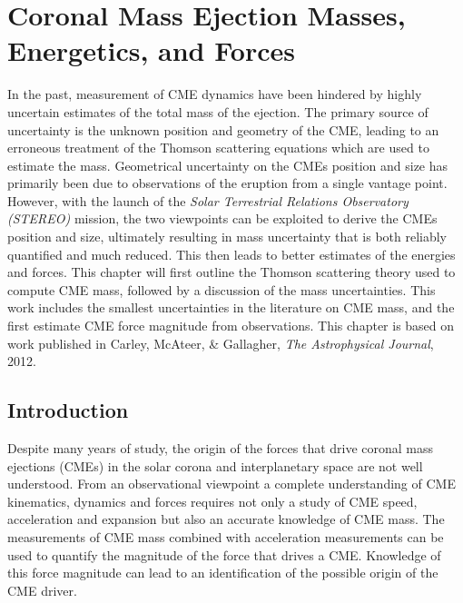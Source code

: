 
\singlespacing
\chapter{Coronal Mass Ejection Masses, Energetics, and Forces} 
\label{chap:4}
\vspace{-6mm}
\doublespacing
In the past, measurement of CME dynamics have been hindered by highly uncertain estimates of the total mass of the ejection. The primary source of uncertainty is the unknown position and geometry of the CME, leading to an erroneous treatment of the Thomson scattering equations which are used to estimate the mass. Geometrical uncertainty on the CMEs position and size has primarily been due to observations of the eruption from a single vantage point. However, with the launch of the {\it Solar Terrestrial Relations Observatory (STEREO)} mission, the two viewpoints can be exploited to derive the CMEs position and size, ultimately resulting in mass uncertainty that is both reliably quantified and much reduced. This then leads to better estimates of the energies and forces. This chapter will first outline the Thomson scattering theory used to compute CME mass, followed by a discussion of the mass uncertainties. This work includes the smallest uncertainties in the literature on CME mass, and the first estimate CME force magnitude from observations. This chapter is based on work published in Carley, McAteer, \& Gallagher, {\it The Astrophysical Journal}, 2012.

\section{Introduction}\label{sec:1}

Despite many years of study, the origin of the forces that drive coronal mass ejections (CMEs) in the solar corona and interplanetary space are not well understood. From an observational viewpoint a complete understanding of CME kinematics, dynamics and forces requires not only a study of CME speed, acceleration and expansion but also an accurate knowledge of CME mass.  The measurements of CME mass combined with acceleration measurements can be used to quantify the magnitude of the force that drives a CME. Knowledge of this force magnitude can lead to an identification of the possible origin of the CME driver. 

